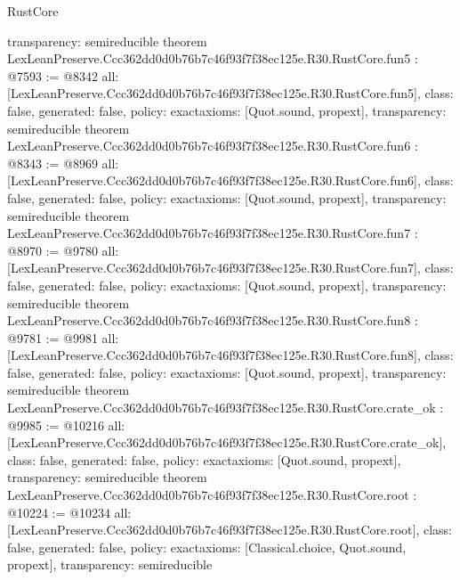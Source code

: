 \begin{lexlean}{RustCore}
\begin{coremodule}
{  transparency: semireducible
}
theorem LexLeanPreserve.Ccc362dd0d0b76b7c46f93f7f38ec125e.R30.RustCore.fun5 : @7593 := @8342 {
  all: [LexLeanPreserve.Ccc362dd0d0b76b7c46f93f7f38ec125e.R30.RustCore.fun5],
  class: false,
  generated: false,
  policy: exact{axioms: [Quot.sound, propext]},
  transparency: semireducible
}
theorem LexLeanPreserve.Ccc362dd0d0b76b7c46f93f7f38ec125e.R30.RustCore.fun6 : @8343 := @8969 {
  all: [LexLeanPreserve.Ccc362dd0d0b76b7c46f93f7f38ec125e.R30.RustCore.fun6],
  class: false,
  generated: false,
  policy: exact{axioms: [Quot.sound, propext]},
  transparency: semireducible
}
theorem LexLeanPreserve.Ccc362dd0d0b76b7c46f93f7f38ec125e.R30.RustCore.fun7 : @8970 := @9780 {
  all: [LexLeanPreserve.Ccc362dd0d0b76b7c46f93f7f38ec125e.R30.RustCore.fun7],
  class: false,
  generated: false,
  policy: exact{axioms: [Quot.sound, propext]},
  transparency: semireducible
}
theorem LexLeanPreserve.Ccc362dd0d0b76b7c46f93f7f38ec125e.R30.RustCore.fun8 : @9781 := @9981 {
  all: [LexLeanPreserve.Ccc362dd0d0b76b7c46f93f7f38ec125e.R30.RustCore.fun8],
  class: false,
  generated: false,
  policy: exact{axioms: [Quot.sound, propext]},
  transparency: semireducible
}
theorem LexLeanPreserve.Ccc362dd0d0b76b7c46f93f7f38ec125e.R30.RustCore.crate_ok : @9985 := @10216 {
  all: [LexLeanPreserve.Ccc362dd0d0b76b7c46f93f7f38ec125e.R30.RustCore.crate_ok],
  class: false,
  generated: false,
  policy: exact{axioms: [Quot.sound, propext]},
  transparency: semireducible
}
theorem LexLeanPreserve.Ccc362dd0d0b76b7c46f93f7f38ec125e.R30.RustCore.root : @10224 := @10234 {
  all: [LexLeanPreserve.Ccc362dd0d0b76b7c46f93f7f38ec125e.R30.RustCore.root],
  class: false,
  generated: false,
  policy: exact{axioms: [Classical.choice, Quot.sound, propext]},
  transparency: semireducible
}


\end{coremodule}
\end{lexlean}
